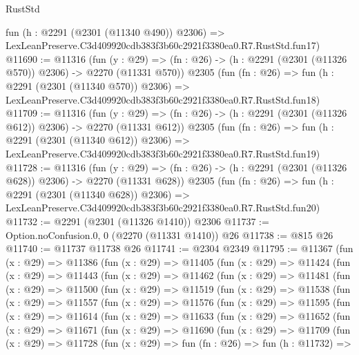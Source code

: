 \begin{lexlean}{RustStd}
\begin{coremodule}
    fun (h : @2291 (@2301 (@11340 @490)) @2306) =>
    LexLeanPreserve.C3d409920cdb383f3b60c2921f3380ea0.R7.RustStd.fun17)
@11690 := @11316
    (fun (y : @29) => (fn : @26) -> (h : @2291 (@2301 (@11326 @570)) @2306) -> @2270 (@11331 @570))
    @2305
    (fun (fn : @26) =>
    fun (h : @2291 (@2301 (@11340 @570)) @2306) =>
    LexLeanPreserve.C3d409920cdb383f3b60c2921f3380ea0.R7.RustStd.fun18)
@11709 := @11316
    (fun (y : @29) => (fn : @26) -> (h : @2291 (@2301 (@11326 @612)) @2306) -> @2270 (@11331 @612))
    @2305
    (fun (fn : @26) =>
    fun (h : @2291 (@2301 (@11340 @612)) @2306) =>
    LexLeanPreserve.C3d409920cdb383f3b60c2921f3380ea0.R7.RustStd.fun19)
@11728 := @11316
    (fun (y : @29) => (fn : @26) -> (h : @2291 (@2301 (@11326 @628)) @2306) -> @2270 (@11331 @628))
    @2305
    (fun (fn : @26) =>
    fun (h : @2291 (@2301 (@11340 @628)) @2306) =>
    LexLeanPreserve.C3d409920cdb383f3b60c2921f3380ea0.R7.RustStd.fun20)
@11732 := @2291 (@2301 (@11326 @1410)) @2306
@11737 := Option.noConfusion.{0, 0} (@2270 (@11331 @1410)) @26
@11738 := @815 @26
@11740 := @11737 @11738 @26
@11741 := @2304 @2349
@11795 := @11367
    (fun (x : @29) =>
    @11386
      (fun (x : @29) =>
      @11405
        (fun (x : @29) =>
        @11424
          (fun (x : @29) =>
          @11443
            (fun (x : @29) =>
            @11462
              (fun (x : @29) =>
              @11481
                (fun (x : @29) =>
                @11500
                  (fun (x : @29) =>
                  @11519
                    (fun (x : @29) =>
                    @11538
                      (fun (x : @29) =>
                      @11557
                        (fun (x : @29) =>
                        @11576
                          (fun (x : @29) =>
                          @11595
                            (fun (x : @29) =>
                            @11614
                              (fun (x : @29) =>
                              @11633
                                (fun (x : @29) =>
                                @11652
                                  (fun (x : @29) =>
                                  @11671
                                    (fun (x : @29) =>
                                    @11690
                                      (fun (x : @29) =>
                                      @11709
                                        (fun (x : @29) =>
                                        @11728
                                          (fun (x : @29) =>
                                          fun (fn : @26) =>
                                          fun (h : @11732) =>

\end{coremodule}
\end{lexlean}
